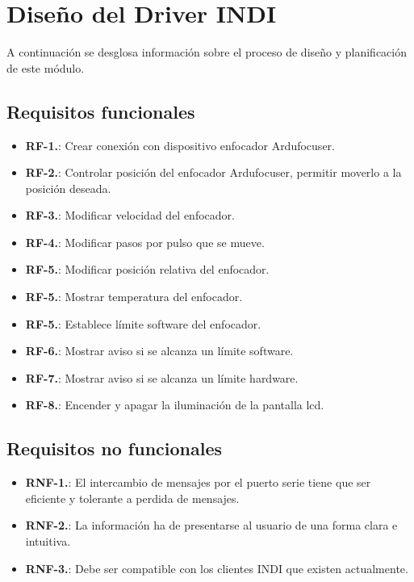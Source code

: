 \section{Diseño del Driver INDI}

A continuación se desglosa información sobre el proceso de diseño y planificación de este módulo.

\subsection{Requisitos funcionales}

\begin{itemize}
	\item \textbf{RF-1.}: Crear conexión con dispositivo enfocador Ardufocuser.
	\item \textbf{RF-2.}: Controlar posición del enfocador Ardufocuser, permitir moverlo a la posición deseada.
	\item \textbf{RF-3.}: Modificar velocidad del enfocador.
	\item \textbf{RF-4.}: Modificar pasos por pulso que se mueve.
	\item \textbf{RF-5.}: Modificar posición relativa del enfocador.
	\item \textbf{RF-5.}: Mostrar temperatura del enfocador.
	\item \textbf{RF-5.}: Establece límite software del enfocador.
	\item \textbf{RF-6.}: Mostrar aviso si se alcanza un límite software.
	\item \textbf{RF-7.}: Mostrar aviso si se alcanza un límite hardware.
	\item \textbf{RF-8.}: Encender y apagar la iluminación de la pantalla lcd.		
\end{itemize}

\subsection{Requisitos no funcionales}
\begin{itemize}
	\item \textbf{RNF-1.}: El intercambio de mensajes por el puerto serie tiene que ser eficiente y tolerante a perdida de mensajes.
	\item \textbf{RNF-2.}: La información ha de presentarse al usuario de una forma clara e intuitiva.
	\item \textbf{RNF-3.}: Debe ser compatible con los clientes INDI que existen actualmente.
\end{itemize}

